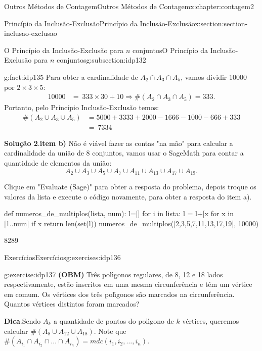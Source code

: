 \documentclass[oneside,10pt,]{book}
\newcommand{\blocktitlefont}{\relax}
\newcommand{\terminology}[1]{\textbf{#1}}
\numberwithin{equation}{section}
\newcommand{\amp}{&}
\begin{document}
\begin{chapterptx}{Outros Métodos de Contagem}{}{Outros Métodos de Contagem}{}{}{x:chapter:contagem2}
\begin{sectionptx}{Princípio da Inclusão-Exclusão}{}{Princípio da Inclusão-Exclusão}{}{}{x:section:section-inclusao-exclusao}
\begin{subsectionptx}{O Princípio da Inclusão-Exclusão para \(n\) conjuntos}{}{O Princípio da Inclusão-Exclusão para \(n\) conjuntos}{}{}{g:subsection:idp132}
\begin{fact}{}{}{g:fact:idp135}
Para obter a cardinalidade de \(A_2\cap A_3\cap A_5\), vamos dividir 10000 por \(2\times 3\times 5\):%
\begin{align*}
10000 \amp =  ~ 333\times 30 + 10 \Rightarrow \#(A_2\cap A_3\cap A_5) = 333. 
\end{align*}
Portanto, pelo Princípio Inclusão-Exclusão temos:%
\begin{align*}
\#(A_2\cup A_3\cup A_5) \amp =  5000+3333+2000-1666-1000-666+333 \\
\amp =  ~ 7334 
\end{align*}
%
\par\smallskip%
\noindent\textbf{\blocktitlefont Solução 2}.\quad{}\terminology{item b)} Não é viável fazer as contas "na mão" para calcular a cardinalidade da união de 8 conjuntos, vamos usar o SageMath para contar a quantidade de elementos da união:%
\begin{equation*}
A_2\cup A_3\cup A_5\cup A_7\cup A_{11}\cup A_{13}\cup A_{17}\cup A_{19}.
\end{equation*}
%
\par
Clique em "Evaluate (Sage)" para obter a resposta do problema, depois troque os valores da lista e execute o código novamente, para obter a resposta do item a).%
\begin{sageinput}
def numeros_de_multiplos(lista, num):
    l=[]
    for i in lista:
        l = l+[x for x in [1..num] if x%
    return len(set(l))
numeros_de_multiplos([2,3,5,7,11,13,17,19], 10000)
\end{sageinput}
\begin{sageoutput}
8289
\end{sageoutput}
\end{fact}
\end{subsectionptx}
%
%
\typeout{************************************************}
\typeout{************************************************}
%
\begin{exercises-subsection}{Exercícios}{}{Exercícios}{}{}{g:exercises:idp136}
\begin{divisionexercise}{1}{}{}{g:exercise:idp137}%
\terminology{(OBM)} Três polı́gonos regulares, de 8, 12 e 18 lados respectivamente, estão inscritos em uma mesma circunferência e têm um vértice em comum. Os vértices dos três polı́gonos são marcados na circunferência. Quantos vértices distintos foram marcados?%
\par\smallskip%
\noindent\textbf{\blocktitlefont Dica}.\hypertarget{g:hint:idp138}{}\quad{}Sendo \(A_k\) a quantidade de pontos do polı́gono de \(k\) vértices, queremos calcular \(\#(A_8 \cup A_{12} \cup A_{18})\). Note que \(\#(A_{i_1} \cap A_{i_2} \cap\ldots \cap A_{i_n}) = mdc(i_1 , i_2 , \ldots , i_n)\).%

\end{divisionexercise}
\end{exercises-subsection}
\end{sectionptx}
\end{chapterptx}
\end{document}
